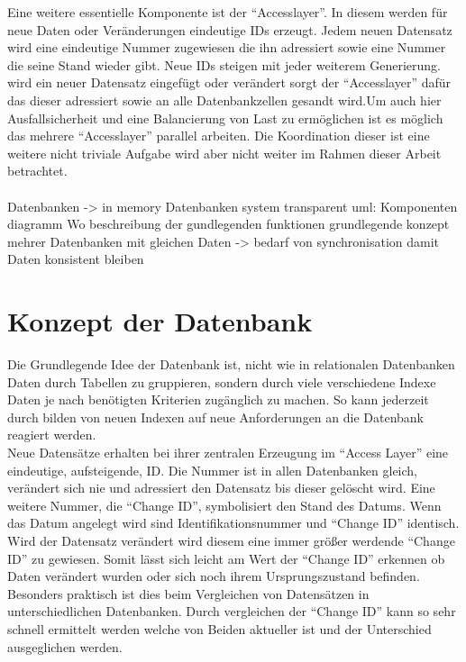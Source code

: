 \documentclass[a4paper,11pt,oneside,%
headsepline,												%
footsepline,												%
bibtotocnumbered									%
]{scrreprt}
\begin{document}
Eine weitere essentielle Komponente ist der \enquote{Accesslayer}. In diesem werden für neue Daten oder Veränderungen eindeutige \ac{ID}s erzeugt. Jedem neuen Datensatz wird eine eindeutige Nummer zugewiesen die ihn adressiert sowie eine Nummer die seine Stand wieder gibt. Neue \ac{ID}s steigen mit jeder weiterem Generierung. wird ein neuer Datensatz eingefügt oder verändert sorgt der \enquote{Accesslayer} dafür das dieser adressiert sowie an alle Datenbankzellen gesandt wird.Um auch hier Ausfallsicherheit und eine Balancierung von Last zu ermöglichen ist es möglich das mehrere \enquote{Accesslayer} parallel arbeiten. Die Koordination dieser ist eine weitere nicht triviale Aufgabe wird aber nicht weiter im Rahmen dieser Arbeit betrachtet.\\\\
 Datenbanken -> in memory
Datenbanken system transparent
uml: Komponenten diagramm
Wo beschreibung der gundlegenden funktionen
grundlegende konzept mehrer Datenbanken mit gleichen Daten -> bedarf von synchronisation damit Daten konsistent bleiben

\section{Konzept der Datenbank}
\label{sec:DBConcept} 

Die Grundlegende Idee der Datenbank ist, nicht wie in relationalen Datenbanken Daten durch Tabellen zu gruppieren, sondern durch viele verschiedene Indexe Daten je nach benötigten Kriterien zugänglich zu machen. So kann jederzeit durch bilden von neuen Indexen auf neue Anforderungen an die Datenbank reagiert werden.\\

Neue Datensätze erhalten bei ihrer zentralen Erzeugung im \enquote{Access Layer} eine eindeutige, aufsteigende, \ac{ID}. Die Nummer ist in allen Datenbanken gleich, verändert sich nie und adressiert den Datensatz bis dieser gelöscht wird. Eine weitere Nummer, die \enquote{Change ID}, symbolisiert den Stand des Datums. Wenn das Datum angelegt wird sind Identifikationsnummer und \enquote{Change ID} identisch. Wird der Datensatz verändert wird diesem eine immer größer werdende \enquote{Change ID} zu gewiesen. Somit lässt sich leicht am Wert der \enquote{Change ID}  erkennen ob Daten verändert wurden oder sich noch ihrem Ursprungszustand befinden. Besonders praktisch ist dies beim Vergleichen von Datensätzen in unterschiedlichen Datenbanken. Durch vergleichen der \enquote{Change ID} kann so sehr schnell ermittelt werden welche von Beiden aktueller ist und der Unterschied ausgeglichen werden.\\
\end{document}

